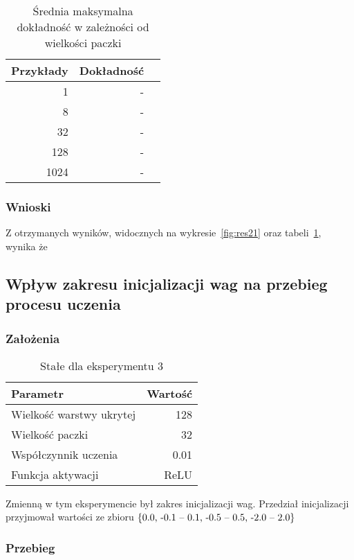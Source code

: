 \documentclass{article}
\begin{document}
\begin{table}[!h]
	\caption{Średnia maksymalna dokładność w zależności od wielkości paczki}
	\label{tabela-res-21}
	\centering
	\begin{tabular}{rrr}
		\toprule
		Przykłady & Dokładność \\
		\midrule
		1          & -             \\
		8          & -             \\
		32         & -             \\
		128        & -             \\
		1024       & -             \\
		\bottomrule
	\end{tabular}
\end{table}

\subsubsection*{Wnioski}

Z otrzymanych wyników, widocznych na wykresie~\ref{fig:res21} oraz tabeli~\ref{tabela-res-21}, wynika że

\newpage
\subsection{Wpływ zakresu inicjalizacji wag na przebieg procesu uczenia}
\subsubsection*{Założenia}
\begin{table}[!h]
	\caption{Stałe dla eksperymentu 3}
	\label{tabela-const-3}
	\centering
	\begin{tabular}{lr}
		\toprule
		Parametr                   & Wartość \\
		\midrule
		Wielkość warstwy ukrytej & 128       \\
		Wielkość paczki          & 32        \\
		Współczynnik uczenia     & 0.01      \\
		Funkcja aktywacji          & ReLU      \\
		\bottomrule
	\end{tabular}
\end{table}

Zmienną w tym eksperymencie był zakres inicjalizacji wag. Przedział inicjalizacji przyjmował wartości ze zbioru \(\{$0.0, -0.1 -- 0.1, -0.5 -- 0.5, -2.0 -- 2.0$\}\)
\subsubsection*{Przebieg}
\end{document}
